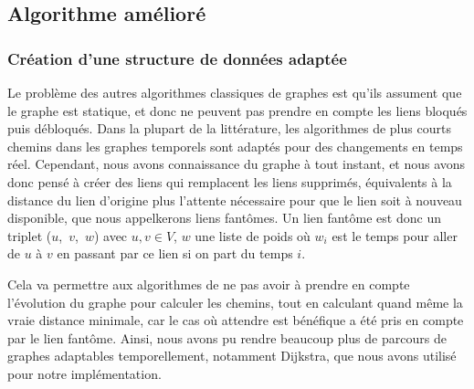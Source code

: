 \subsection{Algorithme amélioré}

\subsubsection{Création d'une structure de données adaptée}
Le problème des autres algorithmes classiques de graphes est qu'ils assument que le graphe est statique, et donc ne peuvent pas prendre en compte les liens bloqués puis débloqués.
Dans la plupart de la littérature, les algorithmes de plus courts chemins dans les graphes temporels sont adaptés pour des changements en temps réel.\cite{lks_metrics}
Cependant, nous avons connaissance du graphe à tout instant, et nous avons donc pensé à créer des liens qui remplacent les liens supprimés,
équivalents à la distance du lien d'origine plus l'attente nécessaire pour que le lien soit à nouveau disponible, que nous appelkerons liens fantômes.
Un lien fantôme est donc un triplet ($u$,~$v$,~$w$) avec $u, v \in V$, $w$ une liste de poids où $w_{i}$ est le temps pour aller de $u$ à $v$ en passant par ce lien si on part du temps $i$. 

Cela va permettre aux algorithmes de ne pas avoir à prendre en compte l'évolution du graphe pour calculer les chemins, tout en calculant quand même la vraie distance minimale,
car le cas où attendre est bénéfique a été pris en compte par le lien fantôme.
Ainsi, nous avons pu rendre beaucoup plus de parcours de graphes adaptables temporellement, notamment Dijkstra, que nous avons utilisé pour notre implémentation.

